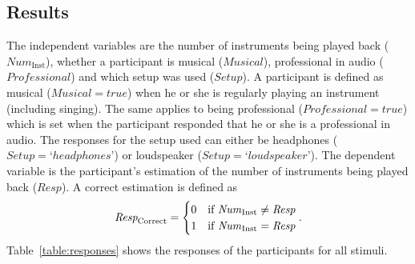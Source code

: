 \subsection{Results}\label{sec:results}

The independent variables are the number of instruments being played back ($\textit{Num}_{\mathrm{Inst}}$), whether a participant is musical ($\textit{Musical}$), professional in audio ($\textit{Professional}$) and which setup was used ($\textit{Setup}$). A participant is defined as musical ($\textit{Musical} = true$) when he or she is regularly playing an instrument (including singing). The same applies to being professional ($\textit{Professional} = true$) which is set when the participant responded that he or she is a professional in audio. The responses for the setup used can either be headphones ($\textit{Setup} = \textrm{`}headphones\textrm{'}$) or loudspeaker ($\textit{Setup} = \textrm{`}loudspeaker\textrm{'}$). The dependent variable is the participant's estimation of the number of instruments being played back ($\textit{Resp}$). A correct estimation is defined as
\begin{equation}
\label{equation:response_correct}
\textit{Resp}_{\mathrm{Correct}} =
\begin{cases}
0 & \text{if } \text{\textit{Num}}_{\mathrm{Inst}} \neq \text{\textit{Resp}}
\\
1 & \text{if } \text{\textit{Num}}_{\mathrm{Inst}} = \text{\textit{Resp}}
\end{cases}
\mathrm{.}
\end{equation}
Table~\ref{table:responses} shows the responses of the participants for all stimuli.
\tabcolsep=5.5pt
